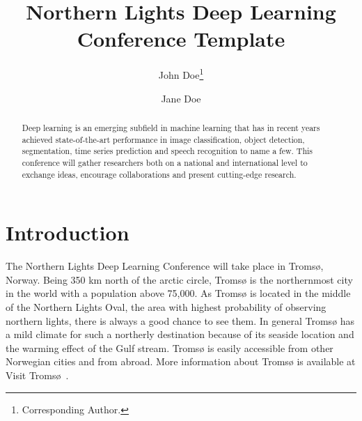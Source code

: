 \documentclass[fullpaper]{nldl}
\title{Northern Lights Deep Learning Conference Template}
\author[1]{John Doe\thanks{Corresponding Author.}}
\author[1,2]{Jane Doe}
\affil[1]{Affiliation 1}
\affil[2]{Affiliation 2}
\affil[ ]{\texttt{\{john.doe, jane.doe\}@affiliation.com}}
\begin{document}
\maketitle

\begin{abstract}
Deep learning is an emerging subfield in machine learning that has in recent years achieved state-of-the-art performance in image classification, object detection, segmentation, time series prediction and speech recognition to name a few.
This conference will gather researchers both on a national and international level to exchange ideas, encourage collaborations and present cutting-edge research.
\end{abstract}

\section{Introduction}
The Northern Lights Deep Learning Conference will take place in Troms{\o}, Norway.
Being 350 km north of the arctic circle, Troms{\o} is the northernmost city in the world with a population above 75,000.
As Troms{\o} is located in the middle of the Northern Lights Oval, the area with highest probability of observing northern lights, there is always a good chance to see them.
In general Troms{\o} has a mild climate for such a northerly destination because of its seaside location and the warming effect of the Gulf stream.
Troms{\o} is easily accessible from other Norwegian cities and from abroad.
More information about Troms{\o} is available at Visit Troms{\o}~\cite{tromso}.
\end{document}
